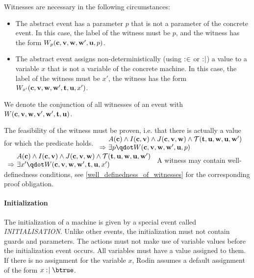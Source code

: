 Witnesses are necessary in the following circumstances:
\begin{itemize}
\item The abstract event has a parameter $p$ that is not a parameter of the concrete  event.
  In this case, the label of the witness must be $p$, and the witness has the form 
  $W_p(\mathbf{c},{\mathbf{v},\mathbf{w}},\mathbf{w}',\mathbf{u},p)$.
\item The abstract event assigns non-deterministically (using $\mathrel{:\mkern1mu\in}$ or $\mathrel{:\mkern1mu\mid}$) 
  a value to a variable $x$ that is not a variable of the concrete machine.
  In this case, the label of the witness must be $x'$, the witness has the form
  $W_{x'}(\mathbf{c},{\mathbf{v},\mathbf{w}},\mathbf{w}',{\mathbf{t},\mathbf{u}},x')$.
\end{itemize}
We denote the conjunction of all witnesses of an event with $W(\mathbf{c},{\mathbf{v},\mathbf{w}},\mathbf{v}',\mathbf{w}',{\mathbf{t},\mathbf{u}})$.

The feasibility of the witness must be proven, i.e. that there is actually a value for which the predicate holds.
%
  {$\begin{array}{r@{\ }l}
      & \axioms \land \absinvariants \land \concinvariants \land \bapred \\
      \limp & \exists p \qdot W(\allconstants,\allvariables,\concvariables',\concparameters,p)      
    \end{array}$}
%
  {$\begin{array}{r@{\ }l}
      & \axioms \land \absinvariants \land \concinvariants \land \bapred \\
      \limp & \exists x' \qdot W(\allconstants,\allvariables,\concvariables',\allparameters,x')
    \end{array}$}
A witness may contain well-definedness conditions, see \ref{well_definedness_of_witnesses}
  for the corresponding proof obligation.

\paragraph{Initialization}
\label{initialization}
The initialization of a machine is given by a special event called \textsl{INITIALISATION}.
Unlike other events, the initialization must not contain guards and parameters.
The actions must not make use of variable values before the initialization event occurs.
All variables must have a value assigned to them. If there is no assignment for the variable $x$, Rodin assumes a default assignment of the form $x\bcmsuch \btrue$.

